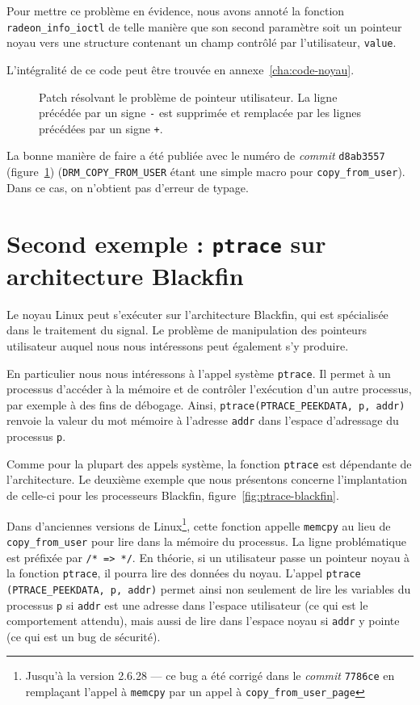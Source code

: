 Pour mettre ce problème en évidence, nous avons annoté la fonction
\texttt{radeon\_info\_ioctl} de telle manière que son second paramètre soit un
pointeur noyau vers une structure contenant un champ contrôlé par l'utilisateur,
\texttt{value}.

L'intégralité de ce code peut être trouvée en annexe~\ref{cha:code-noyau}.

\begin{figure}

  \caption[Patch résolvant le problème de pointeur utilisateur.]
      {Patch résolvant le problème de pointeur utilisateur.
       La ligne précédée par un signe \texttt{-} est supprimée et remplacée
       par les lignes précédées par un signe \texttt{+}.
      }
\label{fig:linux-patch}
\end{figure}

La bonne manière de faire a été publiée avec le numéro de \emph{commit}
\texttt{d8ab3557} (figure~\ref{fig:linux-patch}) (\texttt{DRM\_COPY\_FROM\_USER}
étant une simple macro pour \texttt{copy\_from\_user}). Dans ce cas, on
n'obtient pas d'erreur de typage.

\section{Second exemple : \texttt{ptrace} sur architecture Blackfin}

Le noyau Linux peut s'exécuter sur l'architecture Blackfin, qui est spécialisée
dans le traitement du signal. Le problème de manipulation des pointeurs
utilisateur auquel nous nous intéressons peut également s'y produire.

En particulier nous nous intéressons à l'appel système \texttt{ptrace}. Il
permet à un processus d'accéder à la mémoire et de contrôler l'exécution d'un
autre processus, par exemple à des fins de débogage. Ainsi,
\texttt{ptrace(PTRACE\_PEEKDATA, p, addr)} renvoie la valeur du mot mémoire à
l'adresse \texttt{addr} dans l'espace d'adressage du processus \texttt{p}.

Comme pour la plupart des appels système, la fonction \texttt{ptrace} est
dépendante de l'architecture. Le deuxième exemple que nous présentons concerne
l'implantation de celle-ci pour les processeurs Blackfin,
figure~\ref{fig:ptrace-blackfin}.

Dans d'anciennes versions de Linux\footnote{Jusqu'à la version 2.6.28 --- ce bug
a été corrigé dans le \emph{commit} \texttt{7786ce} en remplaçant l'appel à
\texttt{memcpy} par un appel à \texttt{copy\_from\_user\_page}}, cette fonction
appelle \texttt{memcpy} au lieu de \nolinkurl{copy\_from\_user} pour lire dans
la mémoire du processus. La ligne problématique est préfixée par \texttt{/*
=\textgreater{} */}. En théorie, si un utilisateur passe un pointeur noyau à la
fonction \texttt{ptrace}, il pourra lire des données du noyau. L'appel
\texttt{ptrace (PTRACE\_PEEKDATA, p, addr)} permet ainsi non seulement de lire
les variables du processus \texttt{p} si \texttt{addr} est une adresse dans
l'espace utilisateur (ce qui est le comportement attendu), mais aussi de lire
dans l'espace noyau si \texttt{addr} y pointe (ce qui est un bug de sécurité).

